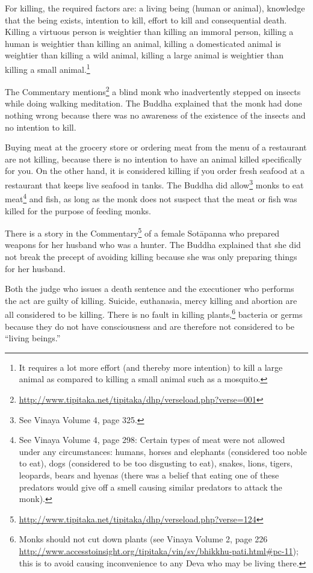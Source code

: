 For killing, the required factors are: a living being (human or animal), knowledge that the being exists, intention to kill, effort to kill and consequential death. Killing a virtuous person is weightier than killing an immoral person, killing a human is weightier than killing an animal, killing a domesticated animal is weightier than killing a wild animal, killing a large animal is weightier than killing a small animal.\footnote{It requires a lot more effort (and thereby more intention) to kill a large animal as compared to killing a small animal such as a mosquito.}

The Commentary mentions\footnote{\url{http://www.tipitaka.net/tipitaka/dhp/verseload.php?verse=001}} a blind monk who inadvertently stepped on insects while doing walking meditation. The Buddha explained that the monk had done nothing wrong because there was no awareness of the existence of the insects and no intention to kill. 

Buying meat at the grocery store or ordering meat from the menu of a restaurant are not killing, because there is no intention to have an animal killed specifically for you. On the other hand, it is considered killing if you order fresh seafood at a restaurant that keeps live seafood in tanks. The Buddha did allow\footnote{See Vinaya Volume 4, page 325.} monks to eat meat\footnote{See Vinaya Volume 4, page 298: Certain types of meat were not allowed under any circumstances: humans, horses and elephants (considered too noble to eat), dogs (considered to be too disgusting to eat), snakes, lions, tigers, leopards, bears and hyenas (there was a belief that eating one of these predators would give off a smell causing similar predators to attack the monk).} and fish, as long as the monk does not suspect that the meat or fish was killed for the purpose of feeding monks.

There is a story in the Commentary\footnote{\url{http://www.tipitaka.net/tipitaka/dhp/verseload.php?verse=124}} of a female Sotāpanna who prepared weapons for her husband who was a hunter. The Buddha explained that she did not break the precept of avoiding killing because she was only preparing things for her husband.

Both the judge who issues a death sentence and the executioner who performs the act are guilty of killing. Suicide, euthanasia, mercy killing and abortion are all considered to be killing. There is no fault in killing plants,\footnote{Monks should not cut down plants (see Vinaya Volume 2, page 226 \url{http://www.accesstoinsight.org/tipitaka/vin/sv/bhikkhu-pati.html\#pc-11}); this is to avoid causing inconvenience to any Deva who may be living there.} bacteria or germs because they do not have consciousness and are therefore not considered to be “living beings.”

